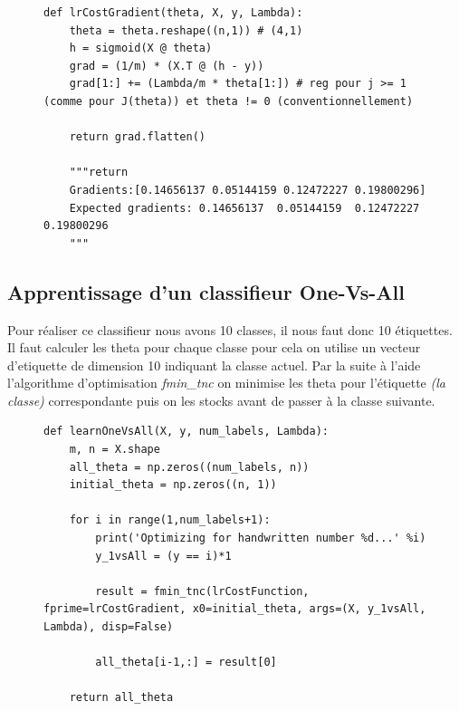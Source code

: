 \begin{figure}[!h]
\begin{verbatim}
def lrCostGradient(theta, X, y, Lambda):
    theta = theta.reshape((n,1)) # (4,1)
    h = sigmoid(X @ theta)
    grad = (1/m) * (X.T @ (h - y))
    grad[1:] += (Lambda/m * theta[1:]) # reg pour j >= 1 (comme pour J(theta)) et theta != 0 (conventionnellement)

    return grad.flatten()

    """return 
    Gradients:[0.14656137 0.05144159 0.12472227 0.19800296]
    Expected gradients: 0.14656137  0.05144159  0.12472227  0.19800296
    """
\end{verbatim}   
\end{figure}

\clearpage
\subsection{Apprentissage d'un classifieur One-Vs-All}

Pour réaliser ce classifieur nous avons 10 classes, il nous faut donc 10 étiquettes. Il faut calculer les theta pour chaque classe pour cela on utilise un vecteur d'etiquette de dimension 10 indiquant 
la classe actuel. Par la suite à l'aide l'algorithme d'optimisation \textit{fmin\_tnc} on minimise les theta pour l'étiquette \textit{(la classe)} correspondante puis on les stocks avant de passer à la 
classe suivante.

\begin{figure}[!h]
\begin{verbatim}
def learnOneVsAll(X, y, num_labels, Lambda):
    m, n = X.shape
    all_theta = np.zeros((num_labels, n))
    initial_theta = np.zeros((n, 1))

    for i in range(1,num_labels+1):
        print('Optimizing for handwritten number %d...' %i)
        y_1vsAll = (y == i)*1

        result = fmin_tnc(lrCostFunction, fprime=lrCostGradient, x0=initial_theta, args=(X, y_1vsAll, Lambda), disp=False)
        
        all_theta[i-1,:] = result[0]

    return all_theta
\end{verbatim}   
\end{figure}
        


